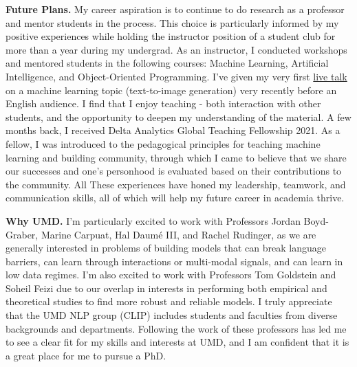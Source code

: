 \documentclass[a4paper]{article}
\begin{document}
\vspace{.2 in}
\noindent \textbf{Future Plans.} My career aspiration is to continue to do research as a professor and mentor students in the process. This choice is particularly informed by my positive experiences while holding the instructor position of a student club for more than a year during my undergrad. As an instructor, I conducted workshops and mentored students in the following courses: Machine Learning, Artificial Intelligence, and Object-Oriented Programming. I’ve given my very first \href{https://youtu.be/ui0X6ozE3bI}{live talk} on a machine learning topic (text-to-image generation) very recently before an English audience. I find that I enjoy teaching - both interaction with other students, and the opportunity to deepen my understanding of the material. A few months back, I received Delta Analytics Global Teaching Fellowship 2021. As a fellow, I was introduced to the pedagogical principles for teaching machine learning and building community, through which I came to believe that we share our successes and one’s personhood is evaluated based on their contributions to the community. All These experiences have honed my leadership, teamwork, and communication skills, all of which will help my future career in academia thrive.

\vspace{.2 in}

\noindent \textbf{Why UMD.} I’m particularly excited to work with Professors Jordan Boyd-Graber, Marine Carpuat, Hal Daumé III, and Rachel Rudinger, as we are generally interested in problems of building models that can break language barriers, can learn through interactions or multi-modal signals, and can learn in low data regimes. I’m also excited to work with Professors Tom Goldstein and Soheil Feizi due to our overlap in interests in performing both empirical and theoretical studies to find more robust and reliable models. I truly appreciate that the UMD NLP group (CLIP) includes students and faculties from diverse backgrounds and departments. Following the work of these professors has led me to see a clear fit for my skills and interests at UMD, and I am confident that it is a great place for me to pursue a PhD.

\end{document}
